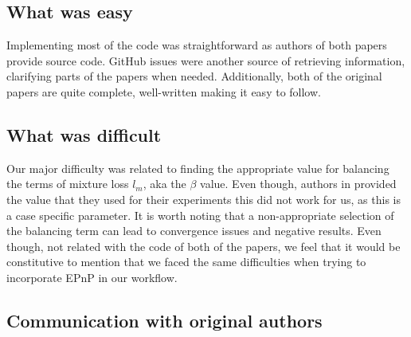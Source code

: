 \subsection{What was easy}
Implementing most of the code was straightforward as authors of both papers provide source code. 
GitHub issues were another source of retrieving information, clarifying parts of the papers when needed. 
Additionally, both of the original papers are quite complete, well-written making it easy to follow.


\subsection{What was difficult}



Our major difficulty was related to finding the appropriate value for balancing the terms of mixture loss $l_m$, aka the $\beta$ value.
Even though, authors in \cite{chen2020end} provided the value that they used for their experiments this did not work for us, as this is a case specific parameter.
It is worth noting that a non-appropriate selection of the balancing term can lead to convergence issues and negative results. 
Even though, not related with the code of both of the papers, we feel that it would be constitutive to mention that we faced the same difficulties when trying to incorporate EPnP in our workflow.

\subsection{Communication with original authors}

